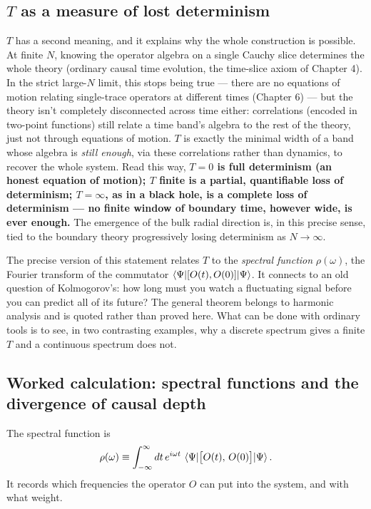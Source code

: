 \subsection*{$T$ as a measure of lost determinism}

$T$ has a second meaning, and it explains why the whole construction is possible. At finite $N$, knowing the operator algebra on a single Cauchy
slice determines the whole theory (ordinary causal time evolution, the time-slice axiom of Chapter 4). In
the strict large-$N$ limit, this stops being true — there are no equations of motion relating single-trace
operators at different times (Chapter 6) — but the theory isn't completely disconnected across time either:
correlations (encoded in two-point functions) still relate a time band's algebra to the rest of the theory,
just not through equations of motion. $T$ is exactly the minimal width of a band whose algebra is
\emph{still enough}, via these correlations rather than dynamics, to recover the whole system. Read this way,
\textbf{$T=0$ is full determinism (an honest equation of motion); $T$ finite is a partial, quantifiable loss of
determinism; $T=\infty$, as in a black hole, is a complete loss of determinism — no finite window of boundary
time, however wide, is ever enough.} The emergence of the bulk radial direction is, in this precise sense,
tied to the boundary theory progressively losing determinism as $N\to\infty$.

The precise version of this statement relates $T$ to the \emph{spectral function} $\rho(\omega)$, the
Fourier transform of the commutator $\braket{\Psi|[O(t),O(0)]|\Psi}$. It connects to an old question of
Kolmogorov's: how long must you watch a fluctuating signal before you can predict all of its future? The
general theorem belongs to harmonic analysis and is quoted rather than proved here. What can be done with
ordinary tools is to see, in two contrasting examples, why a discrete spectrum gives a finite $T$ and a
continuous spectrum does not.

\subsection*{Worked calculation: spectral functions and the divergence of causal depth}

The spectral function is
\[
\rho(\omega) \equiv \int_{-\infty}^\infty dt\, e^{i\omega t}\, \braket{\Psi|\big[O(t),\, O(0)\big]|\Psi} .
\]
It records which frequencies the operator $O$ can put into the system, and with what weight.

